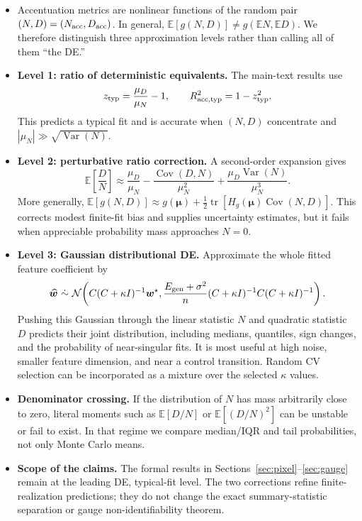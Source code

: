 \documentclass{article}
\providecommand{\E}{\mathbb{E}}
\providecommand{\tr}{\operatorname{tr}}
\newcommand{\tstar}{\bm w^{\star}}
\newcommand{\Egen}{E_{\rm gen}}
\begin{document}
\begin{itemize}[leftmargin=1.3em]
  \item Accentuation metrics are nonlinear functions of the random pair
        $(N,D)=(N_{\rm acc},D_{\rm acc})$. In general,
        $\E[g(N,D)]\neq g(\E N,\E D)$. We therefore distinguish three
        approximation levels rather than calling all of them ``the DE.''
  \item \textbf{Level 1: ratio of deterministic equivalents.} The main-text
        results use
  \begin{equation}
    z_{\rm typ}=\frac{\mu_D}{\mu_N}-1,
    \qquad R_{\rm acc,typ}^2=1-z_{\rm typ}^2.
    \label{eq:ratio-of-de}
  \end{equation}
  This predicts a typical fit and is accurate when $(N,D)$ concentrate and
  $|\mu_N|\gg\sqrt{\operatorname{Var}(N)}$.
  \item \textbf{Level 2: perturbative ratio correction.} A second-order
        expansion gives
  \begin{equation}
    \E\!\left[\frac{D}{N}\right]
    \approx \frac{\mu_D}{\mu_N}
      -\frac{\operatorname{Cov}(D,N)}{\mu_N^2}
      +\frac{\mu_D\operatorname{Var}(N)}{\mu_N^3}.
    \label{eq:ratio-delta}
  \end{equation}
  More generally,
  $\E[g(N,D)]\approx g(\bm\mu)+
  \tfrac12\tr[H_g(\bm\mu)\operatorname{Cov}(N,D)]$.
  This corrects modest finite-fit bias and supplies uncertainty estimates,
  but it fails when appreciable probability mass approaches $N=0$.
  \item \textbf{Level 3: Gaussian distributional DE.} Approximate the whole
        fitted feature coefficient by
  \begin{equation}
    \widehat{\bm w}\ \dot\sim\
      \mathcal N\!\left(
      C(C+\kappa I)^{-1}\tstar,
      \frac{\Egen+\sigma^2}{n}(C+\kappa I)^{-1}C(C+\kappa I)^{-1}
      \right).
    \label{eq:gaussian-de}
  \end{equation}
  Pushing this Gaussian through the linear statistic $N$ and quadratic
  statistic $D$ predicts their joint distribution, including medians,
  quantiles, sign changes, and the probability of near-singular fits. It is
  most useful at high noise, smaller feature dimension, and near a control
  transition. Random CV selection can be incorporated as a mixture over the
  selected $\kappa$ values.
  \item \textbf{Denominator crossing.} If the distribution of $N$ has mass
        arbitrarily close to zero, literal moments such as $\E[D/N]$ or
        $\E[(D/N)^2]$ can be unstable or fail to exist. In that regime we
        compare median/IQR and tail probabilities, not only Monte Carlo
        means.
  \item \textbf{Scope of the claims.} The formal results in
        Sections~\ref{sec:pixel}--\ref{sec:gauge} remain at the leading DE,
        typical-fit level. The two corrections refine finite-realization
        predictions; they do not change the exact summary-statistic
        separation or gauge non-identifiability theorem.
\end{itemize}
\end{document}
